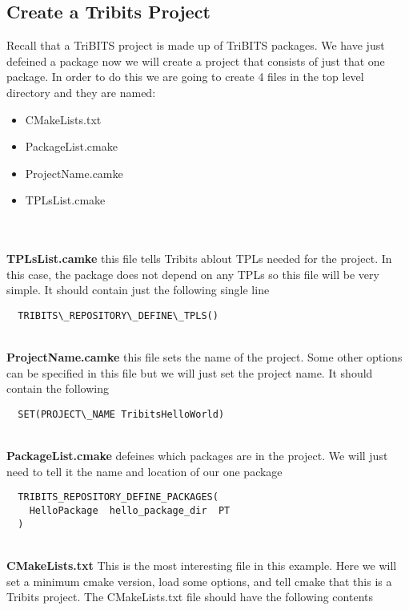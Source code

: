 \documentclass[12pt]{article}
\begin{document}
\subsection*{Create a Tribits Project}

Recall that a TriBITS project is made up of TriBITS packages.  We have
just defeined a package now we will create a project that consists of
just that one package.  In order to do this we are going to create 4
files in the top level directory and they are named:

\begin{itemize}
\item CMakeLists.txt
\item PackageList.cmake
\item ProjectName.camke
\item TPLsList.cmake
\end{itemize}



\textbf{\\\\TPLsList.camke} this file tells Tribits ablout TPLs needed for
the project.  In this case, the package does not depend on any TPLs so
this file will be very simple.  It should contain just the following
single line

\begin{verbatim}
  TRIBITS\_REPOSITORY\_DEFINE\_TPLS()
\end{verbatim}

\textbf{\\ProjectName.camke} this file sets the name of the project.  Some other options can be specified in this file but we
will just set the project name. It should contain the following
  
\begin{verbatim}
  SET(PROJECT\_NAME TribitsHelloWorld)
\end{verbatim}

\textbf{\\PackageList.cmake} defeines which packages are in the project.  We will just need to tell it the name and location
of our one package

\begin{verbatim}
  TRIBITS_REPOSITORY_DEFINE_PACKAGES(
    HelloPackage  hello_package_dir  PT
  )
\end{verbatim}

\textbf{\\CMakeLists.txt} This is the most interesting file in this example.  Here we will set a minimum cmake version, load some 
options, and tell cmake that this is a Tribits project.  The CMakeLists.txt file should have the following contents
\end{document}
